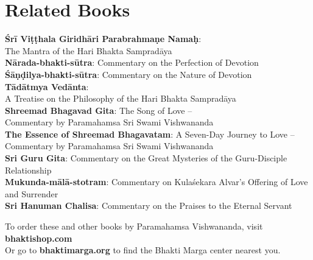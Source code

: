 \chapter*{Related Books}\label{chap-related-books}

\bigskip

\begin{flushleft}

\textbf{Śrī Viṭṭhala Giridhāri Parabrahmaṇe Namaḥ}: \\
The Mantra of the Hari Bhakta Sampradāya\\[1em]

\textbf{Nārada-bhakti-sūtra}: Commentary on the Perfection 
of Devotion \\[1em]

\textbf{Śāṇḍilya-bhakti-sūtra}: Commentary on the Nature 
of Devotion \\[1em]

\textbf{Tādātmya Vedānta}: \\
A Treatise on the Philosophy of the Hari Bhakta Sampradāya\\[1em]

\textbf{Shreemad Bhagavad Gita}: The Song of Love – \\
Commentary by Paramahamsa Sri Swami Vishwananda \\[1em]

\textbf{The Essence of Shreemad Bhagavatam}: A Seven-Day
Journey to Love – Commentary by Paramahamsa Sri Swami Vishwananda \\[1em]

\textbf{Sri Guru Gita}: Commentary on the Great Mysteries
of the Guru-Disciple Relationship \\[1em]

\textbf{Mukunda-mālā-stotram}: Commentary on Kulaśekara
Alvar’s Offering of Love and Surrender \\[1em]

\textbf{Sri Hanuman Chalisa}: Commentary on the Praises 
to the Eternal Servant \\[1em]

\bigskip
\bigskip

To order these and other books by Paramahamsa
Vishwananda, visit \textbf{bhaktishop.com} \\[1em]

\bigskip
Or go to \textbf{bhaktimarga.org} to find the Bhakti Marga
center nearest you.
\end{flushleft}


